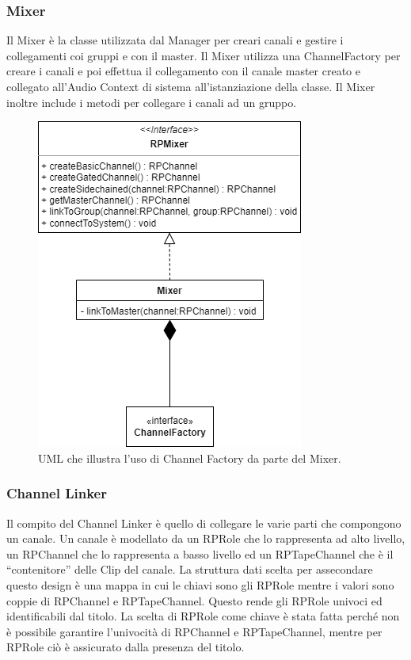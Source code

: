 \documentclass[a4paper,12pt]{report}
\begin{document}
\subsubsection{Mixer}
Il Mixer è la classe utilizzata dal Manager per creari canali e gestire i collegamenti coi gruppi e con il master. Il Mixer utilizza una ChannelFactory per creare i canali e poi effettua il collegamento con il canale master creato e collegato all'Audio Context di sistema all’istanziazione della classe. Il Mixer inoltre include i metodi per collegare i canali ad un gruppo.

\begin{figure}[H]
\centering{}
\includegraphics[scale=0.75]{img/mixer.png}
\caption{UML che illustra l'uso di Channel Factory da parte del Mixer.}
\end{figure}

\subsubsection{Channel Linker}
Il compito del Channel Linker è quello di collegare le varie parti che compongono un canale. Un canale è modellato da un RPRole che lo rappresenta ad alto livello, un RPChannel che lo rappresenta a basso livello ed un RPTapeChannel che è il “contenitore” delle Clip del canale. La struttura dati scelta per assecondare questo design è una mappa in cui le chiavi sono gli RPRole mentre i valori sono coppie di RPChannel e RPTapeChannel. Questo rende gli RPRole univoci ed identificabili dal titolo. La scelta di RPRole come chiave è stata fatta perché non è possibile garantire l’univocità di RPChannel e RPTapeChannel, mentre per RPRole ciò è assicurato dalla presenza del titolo.
\end{document}

